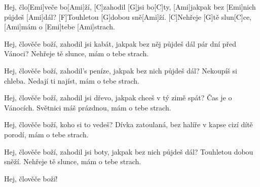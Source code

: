 
\sloka
[Ami]Hej, člo[Emi]veče bo[Ami]ží,
[C]zahodil [G]jsi bo[C]ty,
[Ami]jakpak bez [Emi]nich půjdeš [Ami]dál?
[F]Touhletou [G]dobou sně[Ami]ží.
[C]Nehřeje [G]tě slun[C]ce,
[Ami]mám o [Emi]tebe [Ami]strach.

\sloka
Hej, člověče boží, zahodil jsi kabát,
jakpak bez něj půjdeš dál pár dní před Vánoci?
Nehřeje tě slunce, mám o tebe strach.

\sloka
Hej, člověče boží, zahodil’s peníze,
jakpak bez nich půjdeš dál? Nekoupíš si chleba.
Nedají ti najíst, mám o tebe strach.

\sloka
Hej, člověče boží, zahodil jsi dřevo,
jakpak chceš v tý zimě spát? Čas je o Vánocích.
Světnici máš prázdnou, mám o tebe strach.

\sloka
Hej, člověče boží, koho si to vedeš?
Dívka zatoulaná, bez halíře v kapse
cizí dítě porodí, mám o tebe strach.

\sloka
Hej, člověče boží, zahodil jsi boty,
jakpak bez nich půjdeš dál? Touhletou dobou sněží.
Nehřeje tě slunce, mám o tebe strach.

\sloka
Hej, člověče boží!
